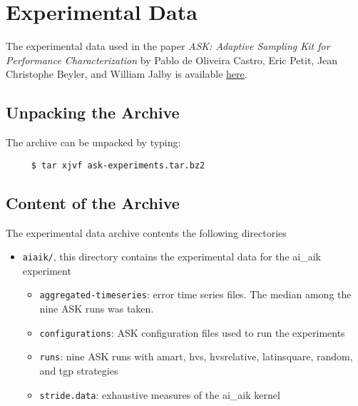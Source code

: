 

\chapter{Experimental Data}

The experimental data used in the paper \emph{ASK: Adaptive Sampling Kit for Performance Characterization}
by Pablo de Oliveira Castro, Eric Petit, Jean Christophe Beyler, and William Jalby is available \href{http://adaptive-sampling-kit.googlecode.com/files/ask-experiments.tar.bz2}{here}.

\section{Unpacking the Archive}

The archive can be unpacked by typing:

\begin{verbatim}
	 $ tar xjvf ask-experiments.tar.bz2
\end{verbatim}

\section{Content of the Archive}

The experimental data archive contents the following directories

\begin{itemize}
	\item \texttt{aiaik/}, this directory contains the experimental data for the ai\_aik experiment
	\begin{itemize}
		\item \texttt{aggregated-timeseries}: error time series files. The median among the nine ASK runs was taken.
		\item \texttt{configurations}: ASK configuration files used to run the experiments
		\item \texttt{runs}: nine ASK runs with amart, hvs, hvsrelative, latinsquare, random, and tgp strategies
		\item \texttt{stride.data}: exhaustive measures of the ai\_aik kernel
	\end{itemize}
\end{itemize}


